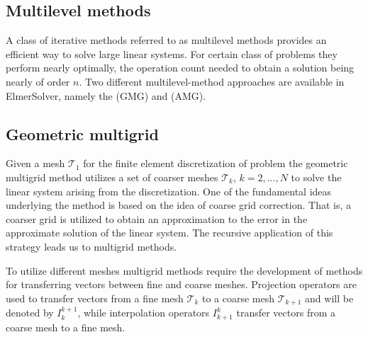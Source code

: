 \begin{versiona}



\section{Multilevel methods}

A class of iterative methods referred to as multilevel methods provides an efficient
way to solve large linear systems. For certain class of problems they perform nearly 
optimally, the operation count needed to obtain a solution being nearly of 
order $n$. Two different multilevel-method approaches are available in 
ElmerSolver, namely the  (GMG) and  (AMG).  

\subsection{Geometric multigrid}

Given a mesh $\mathcal{T}_1$ for the finite element discretization of problem the 
geometric multigrid method utilizes a set of coarser meshes $\mathcal{T}_k$, 
$k=2,...,N$ to solve the linear system arising from the discretization.
One of the fundamental ideas underlying the method is based on the idea of 
coarse grid correction. That is, a coarser grid is utilized to obtain an approximation 
to the error in the approximate solution of the linear system.
The recursive application of this strategy leads us to multigrid methods.  

To utilize different meshes  
multigrid methods require the development of methods for transferring vectors 
between fine and coarse meshes. Projection operators 
are used to transfer vectors from a fine mesh $\mathcal{T}_k$ to a coarse mesh 
$\mathcal{T}_{k+1}$ and will be denoted by $I_{k}^{k+1}$, while  
interpolation operators $I_{k+1}^{k}$ transfer vectors from a coarse mesh to a fine mesh.


\end{versiona}
